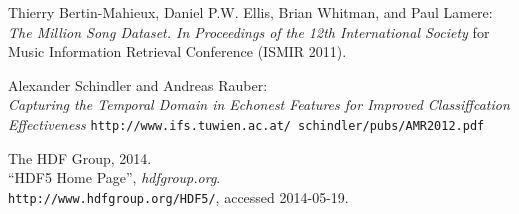 \begin{thebibliography}{10}

Thierry Bertin-Mahieux, Daniel P.W. Ellis, Brian Whitman, and Paul Lamere:\\
\emph{The Million Song Dataset. In Proceedings of the 12th International Society}
for Music Information Retrieval Conference (ISMIR 2011).

Alexander Schindler and Andreas Rauber: \\
\emph{Capturing the Temporal Domain in Echonest Features for Improved Classiffcation Effectiveness}
\texttt{http://www.ifs.tuwien.ac.at/~schindler/pubs/AMR2012.pdf}

The HDF Group,
2014.\\
``HDF5 Home Page'',
\emph{hdfgroup.org}.\\
\verb+http://www.hdfgroup.org/HDF5/+, accessed 2014-05-19.

\end{thebibliography}